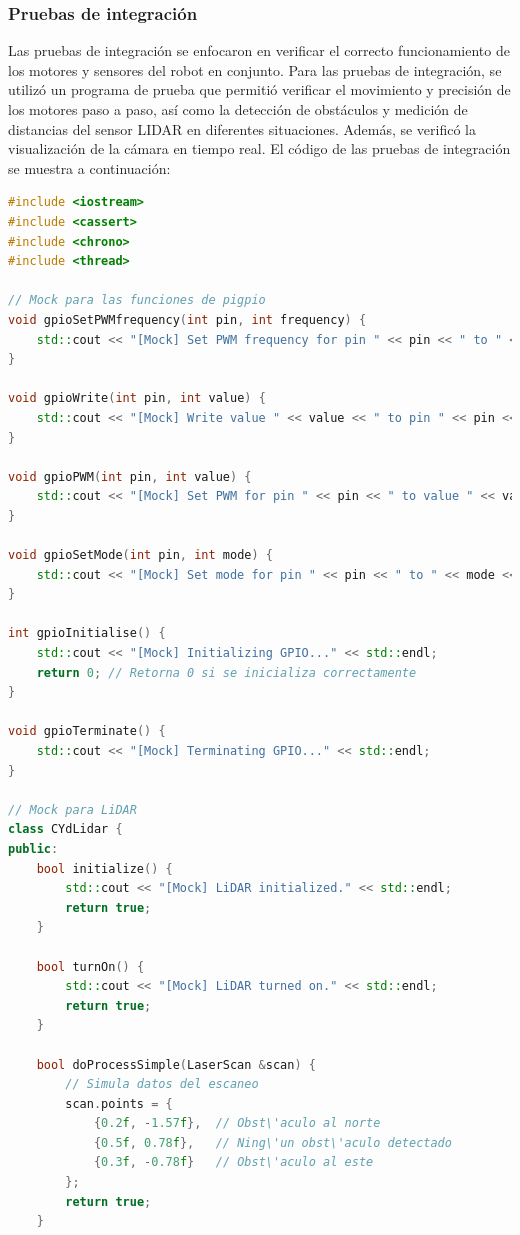     \subsubsection{Pruebas de integraci\'on} %
    \label{ssub:Pruebas de integraci\'on}
        Las pruebas de integraci\'on se enfocaron en verificar el correcto funcionamiento de los motores y sensores del robot en conjunto. 
        Para las pruebas de integraci\'on, se utiliz\'o un programa de prueba que permiti\'o verificar el movimiento y precisi\'on de los motores 
        paso a paso, as\'i como la detecci\'on de obst\'aculos y medici\'on de distancias del sensor LIDAR en diferentes situaciones. 
        Adem\'as, se verific\'o la visualizaci\'on de la c\'amara en tiempo real. 
        \vskip 0.5cm
        El c\'odigo de las pruebas de integraci\'on se muestra a continuaci\'on:
        \begin{lstlisting}[language={C++}, caption={main.cpp}, label={Script}]
#include <iostream>
#include <cassert>
#include <chrono>
#include <thread>

// Mock para las funciones de pigpio
void gpioSetPWMfrequency(int pin, int frequency) {
    std::cout << "[Mock] Set PWM frequency for pin " << pin << " to " << frequency << " Hz" << std::endl;
}

void gpioWrite(int pin, int value) {
    std::cout << "[Mock] Write value " << value << " to pin " << pin << std::endl;
}

void gpioPWM(int pin, int value) {
    std::cout << "[Mock] Set PWM for pin " << pin << " to value " << value << std::endl;
}

void gpioSetMode(int pin, int mode) {
    std::cout << "[Mock] Set mode for pin " << pin << " to " << mode << std::endl;
}

int gpioInitialise() {
    std::cout << "[Mock] Initializing GPIO..." << std::endl;
    return 0; // Retorna 0 si se inicializa correctamente
}

void gpioTerminate() {
    std::cout << "[Mock] Terminating GPIO..." << std::endl;
}

// Mock para LiDAR
class CYdLidar {
public:
    bool initialize() {
        std::cout << "[Mock] LiDAR initialized." << std::endl;
        return true;
    }

    bool turnOn() {
        std::cout << "[Mock] LiDAR turned on." << std::endl;
        return true;
    }

    bool doProcessSimple(LaserScan &scan) {
        // Simula datos del escaneo
        scan.points = {
            {0.2f, -1.57f},  // Obst\'aculo al norte
            {0.5f, 0.78f},   // Ning\'un obst\'aculo detectado
            {0.3f, -0.78f}   // Obst\'aculo al este
        };
        return true;
    }


\end{lstlisting}
